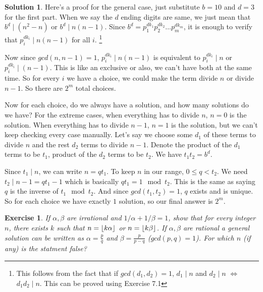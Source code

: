 \documentclass[a4paper,10pt]{article}
\newtheorem{exercise}{Exercise}[section]
\theoremstyle{definition} %
\newtheorem*{solution}{Solution}
\DeclarePairedDelimiter\floor{\lfloor}{\rfloor} %
\begin{document}
    \begin{solution}
        Here's a proof for the general case, just substitute $b = 10$ and $d = 3$ for 
        the first part. When we say the $d$ ending digits are same, we just mean that 
        $b^d \mid (n^2-n)$ or $b^d \mid n(n-1)$. Since $b^d = p_1^{dk_1}p_2^{dk_2} \dots p_m^{dk_m}$,
        it is enough to verify that $p_i^{dk_i} \mid n(n-1)$ for all $i$.
        \footnote{This follows from the fact that if $gcd(d_1,d_2) = 1$, $d_1 \mid n$ and 
        $d_2 \mid n$ $\iff$ $d_1d_2 \mid n$. This can be proved using Exercise 7.1}

        Now since $gcd(n,n-1)=1$, $p_i^{dk_i} \mid n(n-1)$ is equivalent to $ p_i^{dk_i} \mid n$
        or $p_i^{dk_i} \mid (n-1)$. This is like an exclusive or also, we can't have both at the 
        same time. So for every $i$ we have a choice, we could make the term divide $n$ or 
        divide $n-1$. So there are $2^m$ total choices.

        Now for each choice, do we always have a solution, and how many solutions do we have?
        For the extreme cases, when everything has to divide $n$, $n=0$ is the solution. When
        everything has to divide $n-1$, $n=1$ is the solution, but we can't keep checking every
        case manually. Let's say we choose some $d_1$ of these terms to divide $n$ and the rest
        $d_2$ terms to divide $n-1$. Denote the product of the $d_1$ terms to be $t_1$, product
        of the $d_2$ terms to be $t_2$. We have $t_1t_2 = b^d$.

        Since $t_1 \mid n$, we can write $n = qt_1$. To keep $n$ in our range, $0 \leq q < t_2$.
        We need $t_2 \mid n-1 = qt_1-1$ which is basically $qt_1 = 1 \mod t_2$. This is the same
        as saying $q$ is the inverse of $t_1 \mod t_2$. And since $gcd(t_1, t_2) = 1$, $q$ exists
        and is unique. So for each choice we have exactly $1$ solution, so our final answer is $2^m$.
        
    \end{solution}

    \begin{exercise}
        If $\alpha, \beta$ are irrational and $1/\alpha + 1/\beta = 1$, show that for every integer 
        $n$, there exists $k$ such that $n = \floor{k\alpha}$ or $n = \floor{k\beta}$.
        If $\alpha, \beta$ are rational a general solution can be written as $\alpha = \frac{p}{q}$
        and $\beta = \frac{p}{p-q}$ ($gcd(p,q)=1$). For which $n$ (if any) is the statment false? 
    \end{exercise}
\end{document}

